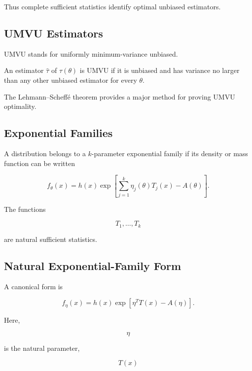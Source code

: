 Thus complete sufficient statistics identify optimal unbiased estimators.

\subsection{UMVU Estimators}
\label{subsec:umvu-estimators}

UMVU stands for uniformly minimum-variance unbiased.

An estimator \(\widehat{\tau}\) of \(\tau(\theta)\) is UMVU if it is
unbiased and has variance no larger than any other unbiased estimator for
every \(\theta\).

The Lehmann--Scheffé theorem provides a major method for proving UMVU
optimality.

\subsection{Exponential Families}
\label{subsec:exponential-families}

A distribution belongs to a \(k\)-parameter exponential family if its
density or mass function can be written

\[
\boxed{
f_\theta(x)
=
h(x)
\exp
\left[
\sum_{j=1}^{k}
\eta_j(\theta)
T_j(x)
-
A(\theta)
\right].
}
\]

The functions

\[
T_1,\ldots,T_k
\]

are natural sufficient statistics.

\subsection{Natural Exponential-Family Form}
\label{subsec:natural-exponential-family}

A canonical form is

\[
\boxed{
f_\eta(x)
=
h(x)
\exp
\left[
\eta^T T(x)
-
A(\eta)
\right].
}
\]

Here,

\[
\eta
\]

is the natural parameter,

\[
T(x)
\]


